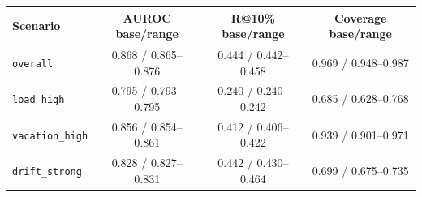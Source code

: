 \begin{tabular}{lccc}
\hline
Scenario & AUROC base/range & R@10\% base/range & Coverage base/range \\
\hline
\texttt{overall} & 0.868 / 0.865--0.876 & 0.444 / 0.442--0.458 & 0.969 / 0.948--0.987 \\
\texttt{load\_high} & 0.795 / 0.793--0.795 & 0.240 / 0.240--0.242 & 0.685 / 0.628--0.768 \\
\texttt{vacation\_high} & 0.856 / 0.854--0.861 & 0.412 / 0.406--0.422 & 0.939 / 0.901--0.971 \\
\texttt{drift\_strong} & 0.828 / 0.827--0.831 & 0.442 / 0.430--0.464 & 0.699 / 0.675--0.735 \\
\hline
\end{tabular}
